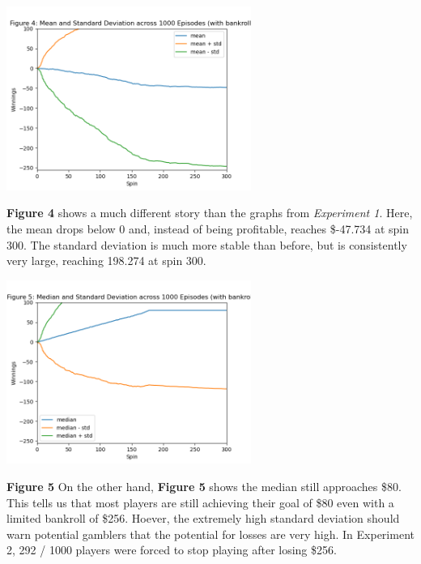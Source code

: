\documentclass[
	letterpaper, %
]{jdf}
\begin{document}
\begin{jdffigure}
\includegraphics[height=6cm]{Figures/figure4.png}%
\label{fig:figure4}%
\end{jdffigure}

\textbf{Figure 4} shows a much different story than the graphs from \emph{Experiment 1}. 
Here, the mean drops below 0 and, instead of being profitable, reaches \$-47.734 at spin 300.
The standard deviation is much more stable than before, but is consistently very large, reaching 198.274 at spin 300.

\begin{jdffigure}
\includegraphics[height=6cm]{Figures/figure5.png}%
\label{fig:figure5}%
\end{jdffigure}

\textbf{Figure 5}
On the other hand, \textbf{Figure 5} shows the median still approaches \$80.
This tells us that most players are still achieving their goal of \$80 even with a limited bankroll of \$256.
Hoever, the extremely high standard deviation should warn potential gamblers that the potential for losses are very high.
In Experiment 2, 292 / 1000 players were forced to stop playing after losing \$256.
\end{document}
